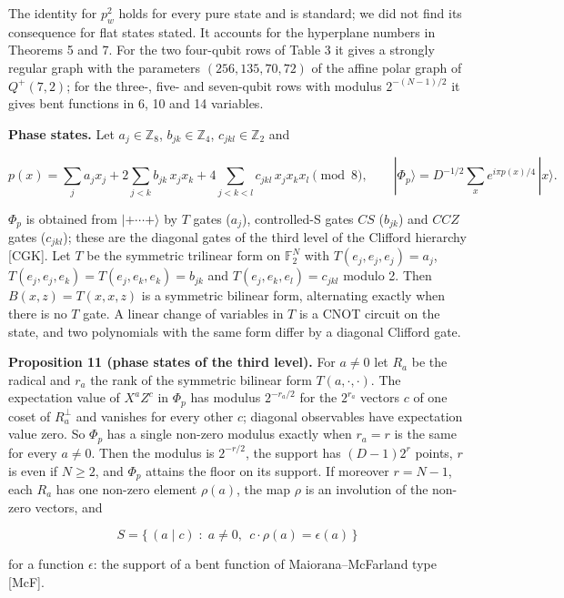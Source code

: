 \documentclass[11pt,a4paper]{article}
\newcommand{\lt}{<}
\begin{document}
The identity for \(p_w^2\) holds for every pure state and is standard; we did not find its consequence for
flat states stated. It accounts for the hyperplane numbers in Theorems 5 and 7. For the two four-qubit
rows of Table 3 it gives a strongly regular graph with the parameters \((256, 135, 70, 72)\) of the affine
polar graph of \(Q^+(7,2)\); for the three-, five- and seven-qubit rows with modulus \(2^{-(N-1)/2}\) it gives
bent functions in 6, 10 and 14 variables.

\textbf{Phase states.} Let \(a_j \in \mathbb{Z}_8\), \(b_{jk} \in \mathbb{Z}_4\), \(c_{jkl} \in \mathbb{Z}_2\) and

\[p(x) = \sum_j a_j x_j + 2\sum_{j \lt k} b_{jk}\, x_j x_k + 4\sum_{j \lt k \lt l} c_{jkl}\, x_j x_k x_l \pmod 8,
\qquad |\Phi_p\rangle = D^{-1/2}\sum_{x} e^{i\pi p(x)/4}\,|x\rangle .\]

\(\Phi_p\) is obtained from \(|{+}\cdots{+}\rangle\) by \(T\) gates (\(a_j\)), controlled-S gates \(CS\) (\(b_{jk}\)) and
\(CCZ\) gates (\(c_{jkl}\)); these are the diagonal gates of the third level of the Clifford hierarchy {[}CGK{]}.
Let \(T\) be the symmetric trilinear form on \(\mathbb{F}_2^N\) with \(T(e_j,e_j,e_j) = a_j\),
\(T(e_j,e_j,e_k) = T(e_j,e_k,e_k) = b_{jk}\) and \(T(e_j,e_k,e_l) = c_{jkl}\) modulo 2. Then
\(B(x,z) = T(x,x,z)\) is a symmetric bilinear form, alternating exactly when there is no \(T\) gate. A linear
change of variables in \(T\) is a CNOT circuit on the state, and two polynomials with the same form differ
by a diagonal Clifford gate.

\textbf{Proposition 11 (phase states of the third level).} For \(a \ne 0\) let \(R_a\) be the radical and \(r_a\)
the rank of the symmetric bilinear form \(T(a,\cdot,\cdot)\). The expectation value of \(X^aZ^c\) in \(\Phi_p\)
has modulus \(2^{-r_a/2}\) for the \(2^{r_a}\) vectors \(c\) of one coset of \(R_a^{\perp}\) and vanishes for every
other \(c\); diagonal observables have expectation value zero. So \(\Phi_p\) has a single non-zero modulus
exactly when \(r_a = r\) is the same for every \(a \ne 0\). Then the modulus is \(2^{-r/2}\), the support has
\((D-1)2^r\) points, \(r\) is even if \(N \ge 2\), and \(\Phi_p\) attains the floor on its support. If moreover
\(r = N-1\), each \(R_a\) has one non-zero element \(\rho(a)\), the map \(\rho\) is an involution of the non-zero
vectors, and

\[S = \{\,(a \mid c) \;:\; a \ne 0,\ \ c\cdot\rho(a) = \epsilon(a)\,\}\]

for a function \(\epsilon\): the support of a bent function of Maiorana--McFarland type {[}McF{]}.
\end{document}
